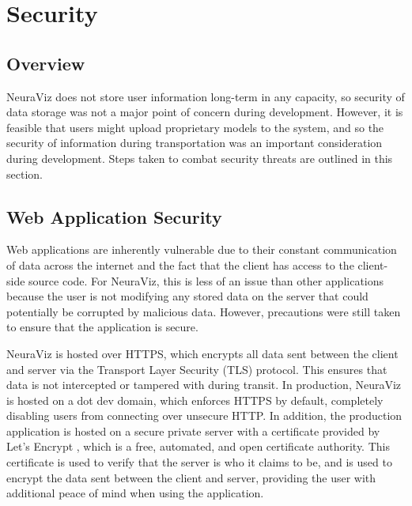 \section{Security}																	
\label{sec:Security}

\subsection{Overview} 
NeuraViz does not store user information long-term in any capacity, so security of data storage was not a major point of concern during development. However, it is feasible that users might upload proprietary models to the system, and so the security of information during transportation was an important consideration during development. Steps taken to combat security threats are outlined in this section.

\subsection{Web Application Security}
Web applications are inherently vulnerable due to their constant communication of data across the internet and the fact that the client has access to the client-side source code. For NeuraViz, this is less of an issue than other applications because the user is not modifying any stored data on the server that could potentially be corrupted by malicious data. However, precautions were still taken to ensure that the application is secure.

NeuraViz is hosted over HTTPS, which encrypts all data sent between the client and server via the Transport Layer Security (TLS) protocol. This ensures that data is not intercepted or tampered with during transit. In production, NeuraViz is hosted on a dot dev domain, which enforces HTTPS by default, completely disabling users from connecting over unsecure HTTP. In addition, the production application is hosted on a secure private server with a certificate provided by Let's Encrypt \cite{letsencrypt}, which is a free, automated, and open certificate authority. This certificate is used to verify that the server is who it claims to be, and is used to encrypt the data sent between the client and server, providing the user with additional peace of mind when using the application.

